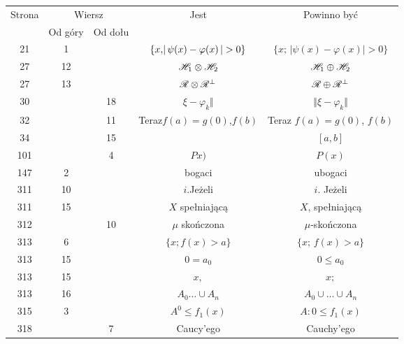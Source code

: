 \documentclass[a4paper,11pt]{article}
\begin{document}
\begin{center}

  \begin{tabular}{|c|c|c|c|c|}
    \hline
    Strona & \multicolumn{2}{c|}{Wiersz} & Jest
                              & Powinno być \\ \cline{2-3}
    & Od góry & Od dołu & & \\
    \hline
    21  &  1 & & $\{ x ,\! |\, {  \psi( x ) - \varphi( x )  } \,| > 0 \}$
           & $\{ x ;\, | \psi( x ) - \varphi( x )| > 0 \}$ \\
    27  & 12 & & $\mathcal{H}_{ 1 } \otimes \mathcal{H}_{ 2 }$ & $\mathcal{H}_{ 1 } \oplus \mathcal{H}_{ 2 }$ \\
    27  & 13 & & $\mathcal{R} \otimes \mathcal{R}^{ \bot }$ & $\mathcal{R} \oplus \mathcal{R}^{ \bot }$ \\
    30  & & 18 & $\xi - \varphi_{ k } \Vert$ & $\Vert \xi - \varphi_{ k } \Vert$ \\
    32  & & 11 & Teraz$f( a ) = g( 0 )$,$f( b )$
           & Teraz $f( a ) = g( 0 )$, $f( b )$ \\
    34  & & 15 & & $[ a, b ]$ \\
    101 & &  4 & $Px )$ & $P( x )$ \\
    147 &  2 & & bogaci & ubogaci \\
    311 & 10 & & $i$.Jeżeli & $i$. Jeżeli \\
    311 & 15 & & $X$ spełniającą & $X$, spełniającą \\
    312 & & 10 & $\mu$ skończona & $\mu$-skończona \\
    313 &  6 & & $\{ x ;\! f( x ) > a \}$ & $\{ x ;\, f( x ) > a \}$ \\
    313 & 15 & & $0 = a_{ 0 }$ & $0 \leq a_{ 0 }$ \\
    313 & 15 & & $x,$ & $x;$ \\
    313 & 16 & & $A_{ 0 } \ldots \cup A_{ n }$
           & $A_{ 0 } \cup \ldots \cup A_{ n }$ \\
    315 & 3 & & $A^{ 0 } \leq f_{ 1 }( x )$ & $A: 0 \leq f_{ 1 }( x )$ \\
    318 & & 7 & Caucy’ego & Cauchy’ego \\
    \hline
  \end{tabular}

\end{center}

\vspace{\spaceTwo}
\end{document}
